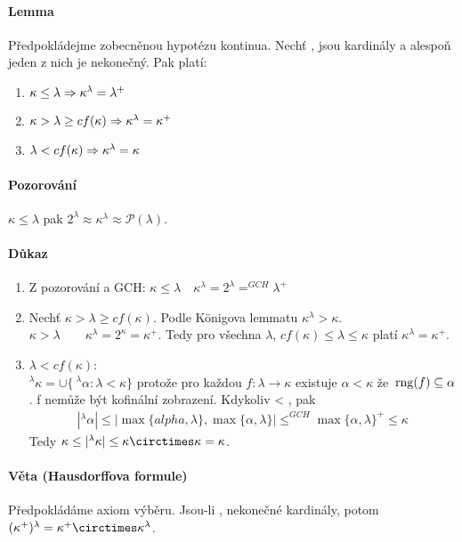 \documentclass[a4paper,12pt,titlepage]{article}
\begin{document}
\begin{enumerate}
\paragraph{Lemma}
Předpokládejme zobecněnou hypotézu kontinua. Nechť \kappa, \lambda {} jsou
kardinály a alespoň jeden z nich je nekonečný. Pak platí:
\begin{enumerate}
	\item $\kappa \le \lambda \Rightarrow \kappa^\lambda = \lambda^+ $
	\item $\kappa > \lambda \ge cf(\kappa) \Rightarrow \kappa^\lambda = \kappa^+ $
	\item $\lambda < cf(\kappa) \Rightarrow \kappa^\lambda = \kappa$
\end{enumerate}
\paragraph{Pozorování}
$\kappa \le \lambda$ pak $2^\lambda \approx \kappa^\lambda \approx
\mathcal{P}(\lambda)$.
\paragraph{Důkaz}
\begin{enumerate}
	\item Z pozorování a GCH: $\kappa \le \lambda \quad \kappa^\lambda =
	2^\lambda =^{GCH} \lambda^+$
	\item Nechť $\kappa > \lambda \ge cf(\kappa)$. Podle Königova lemmatu
	$\kappa^\lambda > \kappa$. \\
	$\kappa > \lambda \qquad \kappa^\lambda = 2^\kappa = \kappa^+$. Tedy pro
	všechna $\lambda$, $cf(\kappa) \le \lambda \le \kappa$ platí $\kappa^\lambda =
	\kappa^+.$
	\item $\lambda < cf(\kappa)$: \\
	$^\lambda \kappa = \cup \{\ ^\lambda \alpha: \lambda < \kappa \}$ protože
	pro každou $f: \lambda \to \kappa$ existuje $\alpha < \kappa$ že $\operatorname*{\,rng}(f)
	\subseteq \alpha$. f nemůže být kofinální zobrazení. Kdykoliv \alpha <
	\kappa, pak
	\begin{align}
		| ^\lambda\alpha| \le | \max\{alpha, \lambda\}, \max\{\alpha, \lambda\}
		| \le^{GCH} \max\{\alpha, \lambda\}^+ \le \kappa
	\end{align}
	Tedy $\kappa \le | ^\lambda\kappa| \le \kappa \circtimes \kappa = \kappa$.
\end{enumerate}
\paragraph{Věta (Hausdorffova formule)}
Předpokládáme axiom výběru. Jsou-li \kappa, \lambda nekonečné kardinály, potom
$(\kappa^+)^\lambda = \kappa^+ \circtimes \kappa^\lambda$.

\end{enumerate}
\end{document}
